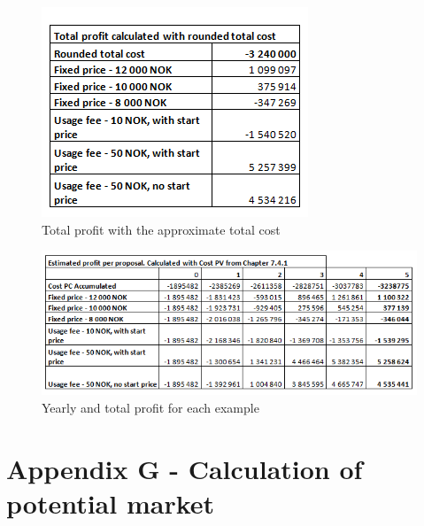 \begin{figure}
\begin{center}
\includegraphics[scale=0.8]{revenuepvappendixprofitrounded}
\caption{Total profit with the approximate total cost}
\label{fig:profitRounded}
\end{center}
\end{figure}

\begin{figure}
\begin{center}
\includegraphics[scale=0.8]{revenuepvappendixprofit}
\caption{Yearly and total profit for each example}
\label{fig:profitAll}
\end{center}
\end{figure}

\newpage
\section*{Appendix G - Calculation of potential market}
\label{G}



